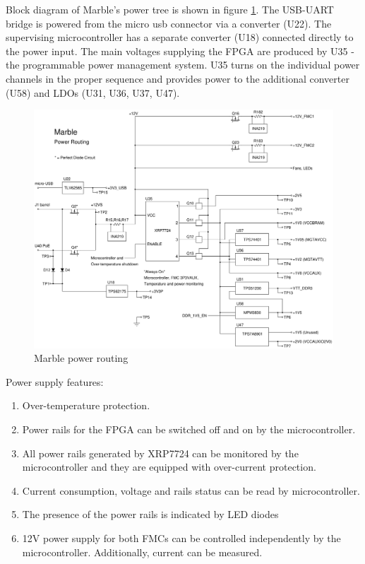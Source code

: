 \documentclass[12pt,oneside,a4]{article}
\begin{document}
Block diagram of Marble's power tree is shown in figure \ref{pwr}. The USB-UART bridge is powered from the micro usb connector via a converter (U22). The supervising microcontroller has a separate converter (U18) connected directly to the power input. The main voltages supplying the FPGA are produced by U35 - the programmable power management system. U35 turns on the individual power channels in the proper sequence and provides power to the additional converter (U58) and LDOs (U31, U36, U37, U47).

\begin{figure}[H]
\begin{center}
\includegraphics[width=1.1\linewidth]{m_power.png}
 \caption{Marble power routing}\label{pwr}
\end{center}
\end{figure}

Power supply features:
\begin{enumerate}
	\item Over-temperature protection.
	\item Power rails for the FPGA can be switched off and on by the microcontroller.
	\item All power rails generated by XRP7724 can be monitored by the microcontroller and they are equipped with over-current protection.
	\item Current consumption, voltage and rails status can be read by microcontroller.
	\item The presence of the power rails is indicated by LED diodes
	\item 12V power supply for both FMCs can be controlled independently by the microcontroller. Additionally,  current can be measured.
\end{enumerate}
\end{document}

